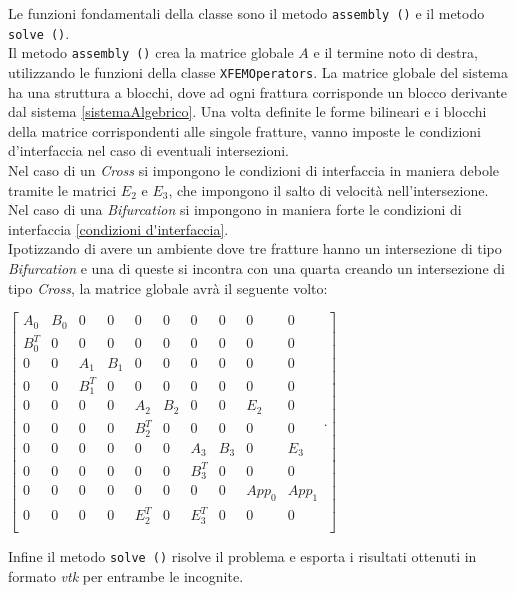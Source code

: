 Le funzioni fondamentali della classe sono il metodo \texttt{assembly ()} e il metodo \texttt{solve ()}. \\
\noindent Il metodo \texttt{assembly ()} crea la matrice globale $A$ e il termine noto di destra, utilizzando le funzioni della classe \texttt{XFEMOperators}. 
La matrice globale del sistema ha una struttura a blocchi, dove ad ogni frattura corrisponde un blocco derivante dal sistema \ref{sistemaAlgebrico}. Una volta definite le forme bilineari e i blocchi della matrice corrispondenti alle singole fratture, vanno imposte le condizioni d'interfaccia nel caso di eventuali intersezioni.\\
\noindent Nel caso di un \textit{Cross} si impongono le condizioni di interfaccia in maniera debole tramite le matrici $E_{2}$ e $E_{3}$, che impongono il salto di velocità nell'intersezione.\\
\noindent Nel caso di una \textit{Bifurcation} si impongono in maniera forte le condizioni di interfaccia \ref{condizioni d'interfaccia}.\\
Ipotizzando di avere un ambiente dove tre fratture hanno un intersezione di tipo \textit{Bifurcation} e una di queste si incontra con una quarta creando un intersezione di tipo \textit{Cross}, la matrice globale avrà il seguente volto:\\
 \begin{center}
  $ \left[ \begin{matrix}
 			A_{0} &  B_{0} & 0 & 0 & 0 & 0 & 0 & 0 & 0 & 0\\ 
 			B_{0}^{T} & 0 & 0 & 0 & 0 & 0 & 0 & 0 & 0 & 0\\
 			0 & 0 & A_{1} &  B_{1} & 0 & 0 & 0 & 0 & 0 & 0 \\ 
		 	0 & 0 & B_{1}^{T} & 0 & 0 & 0 & 0 & 0 & 0 & 0 \\
		 	0 & 0 & 0 & 0 & A_{2} &  B_{2} & 0 & 0 & E_{2} & 0\\ 
		 	0 & 0 & 0 & 0 & B_{2}^{T} & 0 & 0 & 0 & 0 & 0\\
		 	0 & 0 & 0 & 0 & 0 & 0 & A_{3} &  B_{3} & 0 & E_{3} \\ 
 			0 & 0 & 0 & 0 & 0 & 0 & B_{3}^{T} & 0 & 0 & 0\\
 			0 & 0 & 0 & 0 & 0 & 0 & 0 & 0 & App_{0} & App_{1} \\
 			0 & 0 & 0 & 0 & E_{2}^{T} & 0 & E_{3}^{T} & 0 & 0 & 0\\
 			\end{matrix}.\right] $ 
  \end{center}
Infine il metodo \texttt{solve ()} risolve il problema e esporta i risultati ottenuti in formato \emph{vtk} per entrambe le incognite.\\

